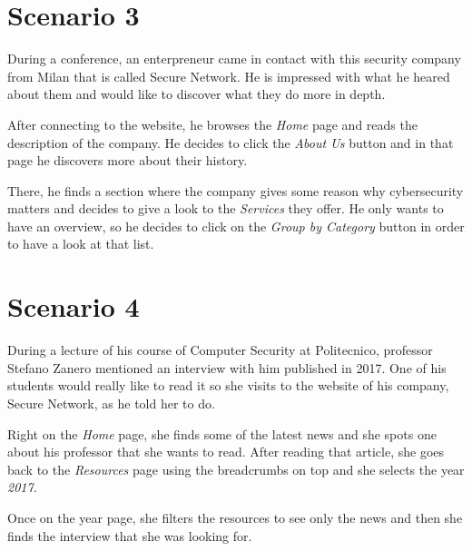 \documentclass[12pt]{report}
\begin{document}
\section{Scenario 3}
During a conference, an enterpreneur came in contact with this security company from Milan that is called Secure Network.
He is impressed with what he heared about them and would like to discover what they do more in depth.

After connecting to the website, he browses the \emph{Home} page and reads the description of the company. 
He decides to click the \emph{About Us} button and in that page he discovers more about their history.

There, he finds a section where the company gives some reason why cybersecurity matters and decides to give a look to the \emph{Services} they offer.
He only wants to have an overview, so he decides to click on the \emph{Group by Category} button in order to have a look at that list.

\section{Scenario 4}
During a lecture of his course of Computer Security at Politecnico, professor Stefano Zanero mentioned an interview with him published in 2017.
One of his students would really like to read it so she visits to the website of his company, Secure Network, as he told her to do.

Right on the \emph{Home} page, she finds some of the latest news and she spots one about his professor that she wants to read.
After reading that article, she goes back to the \emph{Resources} page using the breadcrumbs on top and she selects the year \emph{2017}.

Once on the year page, she filters the resources to see only the news and then she finds the interview that she was looking for.
\end{document}
